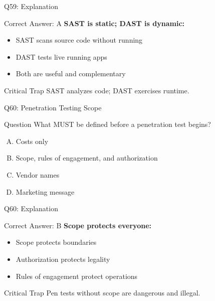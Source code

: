 \documentclass{beamer}
\begin{document}
	\begin{frame}{Q59: Explanation}
		\begin{block}{Correct Answer: A}
			\textbf{SAST is static; DAST is dynamic:}
			\begin{itemize}
				\item SAST scans source code without running
				\item DAST tests live running apps
				\item Both are useful and complementary
			\end{itemize}
		\end{block}
		\begin{alertblock}{Critical Trap}
			SAST analyzes code; DAST exercises runtime.
		\end{alertblock}
	\end{frame}
	
	\begin{frame}{Q60: Penetration Testing Scope}
		\begin{block}{Question}
			What MUST be defined before a penetration test begins?
		\end{block}
		\begin{enumerate}[(A)]
			\item Costs only
			\item Scope, rules of engagement, and authorization
			\item Vendor names
			\item Marketing message
		\end{enumerate}
	\end{frame}
	
	\begin{frame}{Q60: Explanation}
		\begin{block}{Correct Answer: B}
			\textbf{Scope protects everyone:}
			\begin{itemize}
				\item Scope protects boundaries
				\item Authorization protects legality
				\item Rules of engagement protect operations
			\end{itemize}
		\end{block}
		\begin{alertblock}{Critical Trap}
			Pen tests without scope are dangerous and illegal.
		\end{alertblock}
	\end{frame}
	
\end{document}
